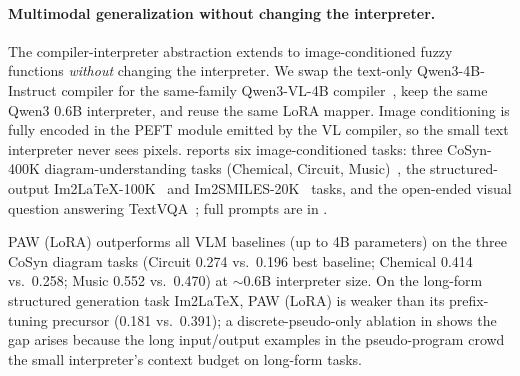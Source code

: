 \documentclass{article}
\theoremstyle{plain}
\theoremstyle{definition}
\theoremstyle{remark}
\begin{document}
\paragraph{Multimodal generalization without changing the interpreter.}
The compiler-interpreter abstraction extends to image-conditioned fuzzy functions \emph{without} changing the interpreter. We swap the text-only Qwen3-4B-Instruct compiler for the same-family Qwen3-VL-4B compiler~\citep{Qwen3-VL2025}, keep the same Qwen3 0.6B interpreter, and reuse the same LoRA mapper. Image conditioning is fully encoded in the PEFT module emitted by the VL compiler, so the small text interpreter never sees pixels.  reports six image-conditioned tasks: three CoSyn-400K diagram-understanding tasks (Chemical, Circuit, Music)~\citep{yang2025scaling,deitke2024molmo}, the structured-output Im2LaTeX-100K~\citep{pmlr-v70-deng17a} and Im2SMILES-20K~\citep{deng2023markuptoimage} tasks, and the open-ended visual question answering TextVQA~\citep{singh2019textvqa}; full prompts are in .

PAW (LoRA) outperforms all VLM baselines (up to 4B parameters) on the three CoSyn diagram tasks (Circuit 0.274 vs.\ 0.196 best baseline; Chemical 0.414 vs.\ 0.258; Music 0.552 vs.\ 0.470) at $\sim$0.6B interpreter size. On the long-form structured generation task Im2LaTeX, PAW (LoRA) is weaker than its prefix-tuning precursor  (0.181 vs.\ 0.391); a discrete-pseudo-only ablation in  shows the gap arises because the long input/output examples in the pseudo-program crowd the small interpreter's context budget on long-form tasks.
\end{document}
